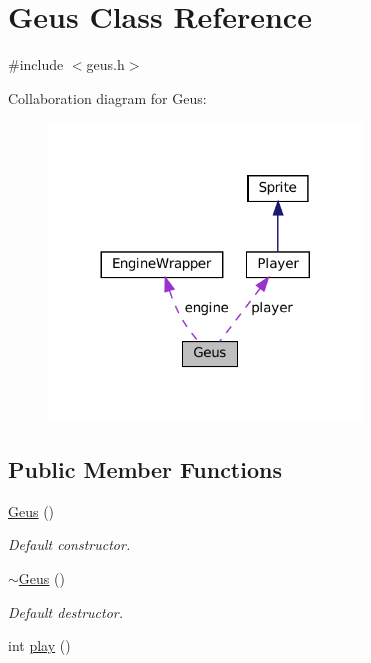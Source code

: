 \hypertarget{classGeus}{}\section{Geus Class Reference}
\label{classGeus}


{\ttfamily \#include $<$geus.\+h$>$}



Collaboration diagram for Geus\+:\nopagebreak
\begin{figure}[H]
\begin{center}
\leavevmode
\includegraphics[width=236pt]{classGeus__coll__graph}
\end{center}
\end{figure}
\subsection*{Public Member Functions}
\begin{DoxyCompactItemize}
\item 
\hyperlink{classGeus_a21852cfcb9229ce95773f15cf1e8620e}{Geus} ()
\begin{DoxyCompactList}\small\item\em Default constructor. \end{DoxyCompactList}\item 
\hyperlink{classGeus_ac6a5d703343da401f4af4c9eb89a5ae8}{$\sim$\+Geus} ()
\begin{DoxyCompactList}\small\item\em Default destructor. \end{DoxyCompactList}\item 
int \hyperlink{classGeus_af62245e002ed29f52e4ffff6372f4da9}{play} ()
\end{DoxyCompactItemize}
